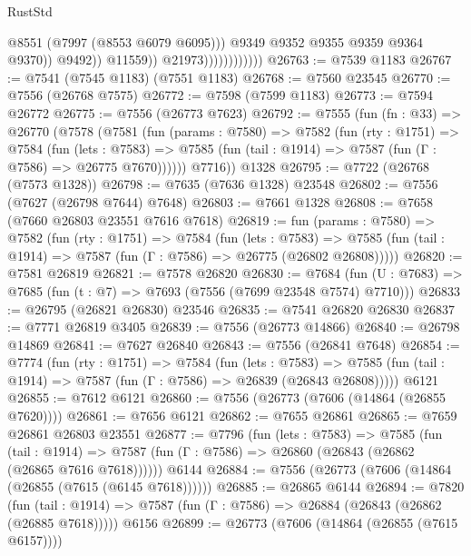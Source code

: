 \begin{lexlean}{RustStd}
\begin{coremodule}
{\begin{coremodule}
{{{{{{{{{{{{{{{{{{{{{{{{{{{{{{{{{{{{{{{{{{{                                          @8551
                                          (@7997 (@8553 @6079 @6095)))
                                        @9349
                                        @9352
                                        @9355
                                        @9359
                                        @9364
                                        @9370))
                                    @9492))
                                @11559))
                            @21973))))))))))))
@26763 := @7539 @1183
@26767 := @7541 (@7545 @1183) (@7551 @1183)
@26768 := @7560 @23545
@26770 := @7556 (@26768 @7575)
@26772 := @7598 (@7599 @1183)
@26773 := @7594 @26772
@26775 := @7556 (@26773 @7623)
@26792 := @7555
    (fun (fn : @33) =>
    @26770
      (@7578
        (@7581
          (fun (params : @7580) =>
          @7582
            (fun (rty : @1751) =>
            @7584
              (fun (lets : @7583) =>
              @7585 (fun (tail : @1914) => @7587 (fun (Γ : @7586) => @26775 @7670))))))
        @7716))
    @1328
@26795 := @7722 (@26768 (@7573 @1328))
@26798 := @7635 (@7636 @1328) @23548
@26802 := @7556 (@7627 (@26798 @7644) @7648)
@26803 := @7661 @1328
@26808 := @7658 (@7660 @26803 @23551 @7616 @7618)
@26819 := fun (params : @7580) =>
  @7582
    (fun (rty : @1751) =>
    @7584
      (fun (lets : @7583) =>
      @7585 (fun (tail : @1914) => @7587 (fun (Γ : @7586) => @26775 (@26802 @26808)))))
@26820 := @7581 @26819
@26821 := @7578 @26820
@26830 := @7684
    (fun (U : @7683) => @7685 (fun (t : @7) => @7693 (@7556 (@7699 @23548 @7574) @7710)))
@26833 := @26795 (@26821 @26830) @23546
@26835 := @7541 @26820 @26830
@26837 := @7771 @26819 @3405
@26839 := @7556 (@26773 @14866)
@26840 := @26798 @14869
@26841 := @7627 @26840
@26843 := @7556 (@26841 @7648)
@26854 := @7774
    (fun (rty : @1751) =>
    @7584
      (fun (lets : @7583) =>
      @7585 (fun (tail : @1914) => @7587 (fun (Γ : @7586) => @26839 (@26843 @26808)))))
    @6121
@26855 := @7612 @6121
@26860 := @7556 (@26773 (@7606 (@14864 (@26855 @7620))))
@26861 := @7656 @6121
@26862 := @7655 @26861
@26865 := @7659 @26861 @26803 @23551
@26877 := @7796
    (fun (lets : @7583) =>
    @7585
      (fun (tail : @1914) =>
      @7587 (fun (Γ : @7586) => @26860 (@26843 (@26862 (@26865 @7616 @7618))))))
    @6144
@26884 := @7556 (@26773 (@7606 (@14864 (@26855 (@7615 (@6145 @7618))))))
@26885 := @26865 @6144
@26894 := @7820
    (fun (tail : @1914) => @7587 (fun (Γ : @7586) => @26884 (@26843 (@26862 (@26885 @7618)))))
    @6156
@26899 := @26773 (@7606 (@14864 (@26855 (@7615 @6157))))
}}}}}}}}}}}}}}}}}}}}}}}}}}}}}}}}}}}}}}}}}}}
\end{coremodule}}
\end{coremodule}
\end{lexlean}

